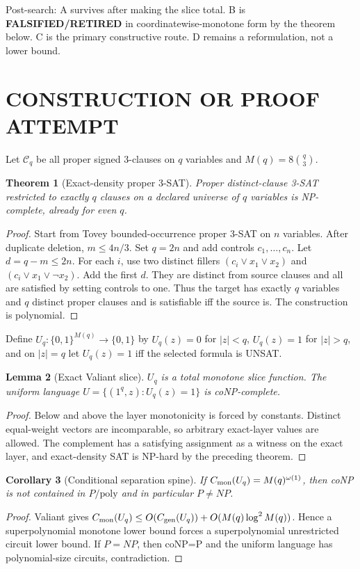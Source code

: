 \documentclass[11pt]{article}
\newtheorem{theorem}{Theorem}
\newtheorem{lemma}[theorem]{Lemma}
\newtheorem{corollary}[theorem]{Corollary}
\begin{document}
Post-search: A survives after making the slice total. B is \textbf{FALSIFIED/RETIRED} in coordinatewise-monotone form by the theorem below. C is the primary constructive route. D remains a reformulation, not a lower bound.

\section{CONSTRUCTION OR PROOF ATTEMPT}
Let $\mathcal C_q$ be all proper signed 3-clauses on $q$ variables and $M(q)=8\binom q3$.

\begin{theorem}[Exact-density proper 3-SAT]
Proper distinct-clause 3-SAT restricted to exactly $q$ clauses on a declared universe of $q$ variables is NP-complete, already for even $q$.
\end{theorem}
\begin{proof}
Start from Tovey bounded-occurrence proper 3-SAT on $n$ variables. After duplicate deletion, $m\le4n/3$. Set $q=2n$ and add controls $c_1,\ldots,c_n$. Let $d=q-m\le2n$. For each $i$, use two distinct fillers $(c_i\vee x_1\vee x_2)$ and $(c_i\vee x_1\vee\neg x_2)$. Add the first $d$. They are distinct from source clauses and all are satisfied by setting controls to one. Thus the target has exactly $q$ variables and $q$ distinct proper clauses and is satisfiable iff the source is. The construction is polynomial.
\end{proof}

Define $U_q:\{0,1\}^{M(q)}\to\{0,1\}$ by $U_q(z)=0$ for $|z|<q$, $U_q(z)=1$ for $|z|>q$, and on $|z|=q$ let $U_q(z)=1$ iff the selected formula is UNSAT.

\begin{lemma}[Exact Valiant slice]
$U_q$ is a total monotone slice function. The uniform language $U=\{(1^q,z):U_q(z)=1\}$ is coNP-complete.
\end{lemma}
\begin{proof}
Below and above the layer monotonicity is forced by constants. Distinct equal-weight vectors are incomparable, so arbitrary exact-layer values are allowed. The complement has a satisfying assignment as a witness on the exact layer, and exact-density SAT is NP-hard by the preceding theorem.
\end{proof}

\begin{corollary}[Conditional separation spine]
If $C_{\rm mon}(U_q)=M(q)^{\omega(1)}$, then coNP is not contained in $P/\mathrm{poly}$ and in particular $P\ne NP$.
\end{corollary}
\begin{proof}
Valiant gives $C_{\rm mon}(U_q)\le O(C_{\rm gen}(U_q))+O(M(q)\log^2M(q))$. Hence a superpolynomial monotone lower bound forces a superpolynomial unrestricted circuit lower bound. If $P=NP$, then coNP=P and the uniform language has polynomial-size circuits, contradiction.
\end{proof}
\end{document}
